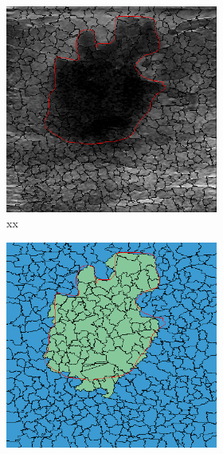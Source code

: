 \begin{figure}[h]
  \centering
    \begin{subfigure}[b]{0.4\textwidth}
      \begin{subfigure}[b]{0.48\textwidth}
          \includegraphics[width=\textwidth]{goodQSorigin}
          \caption{xx}
      \end{subfigure}
      \hfill
      \begin{subfigure}[b]{0.48\textwidth}
          \includegraphics[width=\textwidth]{goodQSseg}

\end{subfigure}
\end{subfigure}
\end{figure}
